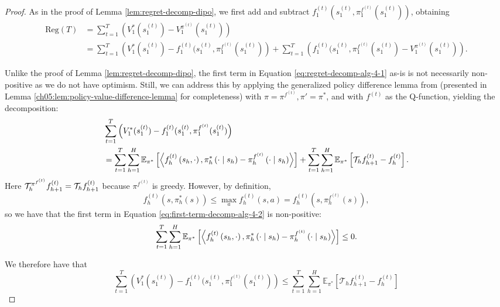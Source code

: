\begin{proof}
As in the proof of Lemma \ref{lem:regret-decomp-dipo}, we first add and subtract $f_1^{(t)}(s_1^{(t)}, \pi_1^{f^{(t)}}(s_1^{(t)}))$, obtaining
    \begin{align}
        \text{Reg}(T) &= \sum_{t=1}^T\left(V_1^{*}(s_1^{(t)})-V_1^{\pi^{(t)}}(s_1^{(t)})\right) \\
        &= \sum_{t=1}^T \left(V_1^{*}(s_1^{(t)})-f_1^{(t)}(s_1^{(t)}, \pi_1^{f^{(t)}}(s_1^{(t)})\right) + \sum_{t=1}^T\left(f_1^{(t)}(s_1^{(t)}, \pi_1^{f^{(t)}}(s_1^{(t)})-V_1^{\pi^{(t)}}(s_1^{(t)})\right).
        \label{eq:regret-decomp-alg-4-1}
    \end{align}

    Unlike the proof of Lemma \ref{lem:regret-decomp-dipo}, the first term in Equation \ref{eq:regret-decomp-alg-4-1} as-is is not necessarily non-positive as we do not have optimism. Still, we can address this by applying the generalized policy difference lemma from \citet{efroni2020optimisticpolicyoptimizationbandit, cai2020provably} (presented in Lemma \ref{ch05:lem:policy-value-difference-lemma} for completeness) with $\pi = \pi^{f^{(t)}}, \pi' = \pi^*$, and with $f^{(t)}$ as the Q-function, yielding the decomposition:
    \begin{align}
        &\sum_{t=1}^T \left(V_1^{*}(s_1^{(t)})-f_1^{(t)}(s_1^{(t)}, \pi_1^{f^{(t)}}(s_1^{(t)})\right)\\
        &= \sum_{t=1}^T\sum_{h=1}^H \mathbb{E}_{\pi^*}\left[\left\langle f_h^{(t)}\left(s_h, \cdot\right), \pi_h^{*}\left(\cdot \mid s_h\right)-\pi_h^{f^{(t)}}\left(\cdot \mid s_h\right)\right\rangle\right] + \sum_{t=1}^T \sum_{h=1}^H \mathbb{E}_{\pi^*}\left[{\mathcal{T}}_hf_{h+1}^{(t)} - f_h^{(t)}\right].
        \label{eq:first-term-decomp-alg-4-2}
    \end{align}
    Here ${\mathcal{T}}_h^{\pi^{f^{(t)}}}f_{h+1}^{(t)}={\mathcal{T}}_hf_{h+1}^{(t)}$ because $\pi^{f^{(t)}}$ is greedy. However, by definition,
\[f_h^{(t)}(s, \pi_h^*(s)) \leq \max_a f_h^{(t)}(s, a) = f_h^{(t)}(s, \pi_h^{f^{(t)}}(s)),\]
so we have that the first term in Equation \ref{eq:first-term-decomp-alg-4-2} is non-positive:
    \begin{equation}
        \sum_{t=1}^T\sum_{h=1}^H \mathbb{E}_{\pi^*}\left[\left\langle f_h^{(t)}\left(s_h, \cdot\right), \pi_h^{*}\left(\cdot \mid s_h\right)-\pi_h^{f^{(t)}}\left(\cdot \mid s_h\right)\right\rangle\right] \leq 0.
        \label{eq:nonpositive-alg-4-3}
    \end{equation}
    
    We therefore have that
    \begin{equation}
        \sum_{t=1}^T \left(V_1^{*}(s_1^{(t)})-f_1^{(t)}(s_1^{(t)}, \pi_1^{f^{(t)}}(s_1^{(t)})\right) \leq \sum_{t=1}^T \sum_{h=1}^H \mathbb{E}_{\pi^*}\left[\mathcal{T}_h f_{h+1}^{(t)}- f_h^{(t)}\right]
        \label{eq:first-term-final-regret-decomp-alg-4-6}
    \end{equation}


\end{proof}
